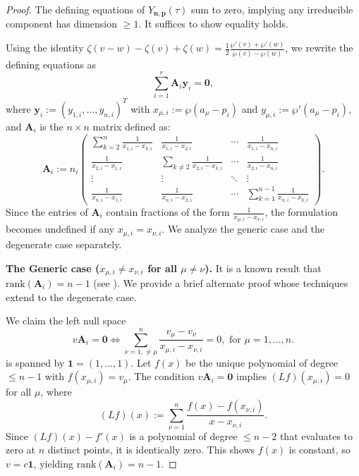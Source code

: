 \documentclass[11pt]{amsart}
\theoremstyle{remark}
\numberwithin{equation}{section}
\begin{document}
\begin{proof}
The defining equations of $Y_{\mathbf{n},\mathbf{p}}(\tau)$ sum to zero, implying any irreducible component has dimension $\geq 1$. It suffices to show equality holds.

Using the identity $\zeta(v-w) - \zeta(v) + \zeta(w) = \frac{1}{2}\frac{\wp'(v) + \wp'(w)}{\wp(v)-\wp(w)}$, we rewrite the defining equations as
\begin{equation} \label{e:Lame_alg_form}
    \sum_{i=1}^{r} \mathbf{A}_i \mathbf{y}_i = \mathbf{0},
\end{equation}
where $\mathbf{y}_i := (y_{1,i}, \dots, y_{n,i})^T$ with $x_{\mu,i} := \wp(a_\mu - p_i)$ and $y_{\mu,i} := \wp'(a_\mu - p_i)$, and $\mathbf{A}_i$ is the $n \times n$ matrix defined as:
\[
\mathbf{A}_i := n_i
\left(
\begin{matrix}
\sum_{k=2}^n \frac{1}{x_{1,i} - x_{k,i}}  & \frac{1}{x_{1,i}-x_{2,i}} & \cdots & \frac{1}{x_{1,i}-x_{n,i}} \\
\frac{1}{x_{2,i}-x_{1,i}} & \sum_{k \neq 2} \frac{1}{x_{2,i} - x_{k,i}} & \cdots & \frac{1}{x_{2,i}-x_{n,i}} \\
\vdots & \vdots & \ddots & \vdots \\
\frac{1}{x_{n,i}-x_{1,i}} & \frac{1}{x_{n,i}-x_{2,i}} & \cdots & \sum_{k=1}^{n-1} \frac{1}{x_{n,i} - x_{k,i}}
\end{matrix}
\right).
\]
Since the entries of $\mathbf{A}_i$ contain fractions of the form $\frac{1}{x_{\mu,i} - x_{\nu,i}}$, the formulation becomes undefined if any $x_{\mu,i} = x_{\nu,i}$. We analyze the generic case and the degenerate case separately.

\vspace{0.5em}
\textbf{The Generic case ($x_{\mu, i} \neq x_{\nu, i}$ for all $\mu \neq \nu$).}
It is a known result that $\mathrm{rank}(\mathbf{A}_i) = n-1$ (see \cite[Proof of Proposition 5.8.3]{Chai_Lin_Wang_2015}). We provide a brief alternate proof whose techniques extend to the degenerate case. 

We claim the left null space 
\[
v\mathbf{A}_i = \mathbf{0} \Leftrightarrow \sum_{\nu=1,\neq \mu}^n \frac{v_\mu - v_\nu}{x_{\mu,i} - x_{\nu,i}} =0, \text{ for }\mu=1,\dots,n.
\]
is spanned by $\mathbf{1} = (1,\dots,1)$. Let $f(x)$ be the unique polynomial of degree $\leq n-1$ with $f(x_{\mu,i}) = v_\mu$. The condition $v\mathbf{A}_i = \mathbf{0}$ implies $(Lf)(x_{\mu,i}) = 0$ for all $\mu$, where
\[
    (Lf)(x) := \sum_{\nu=1}^n \frac{f(x) - f(x_{\nu,i})}{x - x_{\nu,i}}.
\]
Since $(Lf)(x) - f'(x)$ is a polynomial of degree $\leq n-2$ that evaluates to zero at $n$ distinct points, it is identically zero. This shows $f(x)$ is constant, so $v = c\mathbf{1}$, yielding $\mathrm{rank}(\mathbf{A}_i) = n-1$.


\end{proof}
\end{document}
